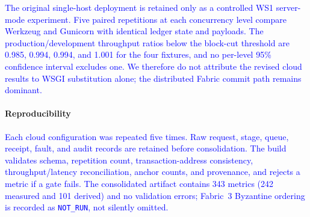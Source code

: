 \documentclass[final,5p,times,twocolumn]{elsarticle}
\begin{document}
\textcolor{blue}{The original single-host deployment is retained only as a controlled WS1 server-mode experiment. Five paired repetitions at each concurrency level compare Werkzeug and Gunicorn with identical ledger state and payloads. The production/development throughput ratios below the block-cut threshold are 0.985, 0.994, 0.994, and 1.001 for the four fixtures, and no per-level 95\% confidence interval excludes one. We therefore do not attribute the revised cloud results to WSGI substitution alone; the distributed Fabric commit path remains dominant.}

\paragraph*{\textbf{Reproducibility}} \textcolor{blue}{Each cloud configuration was repeated five times. Raw request, stage, queue, receipt, fault, and audit records are retained before consolidation. The build validates schema, repetition count, transaction-address consistency, throughput/latency reconciliation, anchor counts, and provenance, and rejects a metric if a gate fails. The consolidated artifact contains 343 metrics (242 measured and 101 derived) and no validation errors; Fabric~3 Byzantine ordering is recorded as \texttt{NOT\_RUN}, not silently omitted.}
\end{document}
